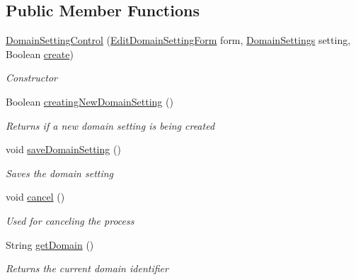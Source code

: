 \subsection*{Public Member Functions}
\begin{DoxyCompactItemize}
\item 
\hyperlink{class_web_analyzer_1_1_u_i_1_1_interaction_objects_1_1_domain_setting_control_a301b531dda08a3e63de11d1fed1b8742}{Domain\+Setting\+Control} (\hyperlink{class_web_analyzer_1_1_u_i_1_1_edit_domain_setting_form}{Edit\+Domain\+Setting\+Form} form, \hyperlink{class_web_analyzer_1_1_models_1_1_settings_model_1_1_domain_settings}{Domain\+Settings} setting, Boolean \hyperlink{_u_i_2_h_t_m_l_resources_2js_2lib_2underscore_8min_8js_a8bd5981157799459d39a59e8c4a0de04}{create})
\begin{DoxyCompactList}\small\item\em Constructor \end{DoxyCompactList}\item 
Boolean \hyperlink{class_web_analyzer_1_1_u_i_1_1_interaction_objects_1_1_domain_setting_control_a8216956129f4fc43850bbb38d1287ad4}{creating\+New\+Domain\+Setting} ()
\begin{DoxyCompactList}\small\item\em Returns if a new domain setting is being created \end{DoxyCompactList}\item 
void \hyperlink{class_web_analyzer_1_1_u_i_1_1_interaction_objects_1_1_domain_setting_control_a0f5c683be120524708ad1dcd570ed4d5}{save\+Domain\+Setting} ()
\begin{DoxyCompactList}\small\item\em Saves the domain setting \end{DoxyCompactList}\item 
void \hyperlink{class_web_analyzer_1_1_u_i_1_1_interaction_objects_1_1_domain_setting_control_a88a19e4077e5a695bb303d38401ffc7d}{cancel} ()
\begin{DoxyCompactList}\small\item\em Used for canceling the process \end{DoxyCompactList}\item 
String \hyperlink{class_web_analyzer_1_1_u_i_1_1_interaction_objects_1_1_domain_setting_control_ad74139e31259a870a6937db206289f30}{get\+Domain} ()
\begin{DoxyCompactList}\small\item\em Returns the current domain identifier \end{DoxyCompactList}\item 

\end{DoxyCompactItemize}

